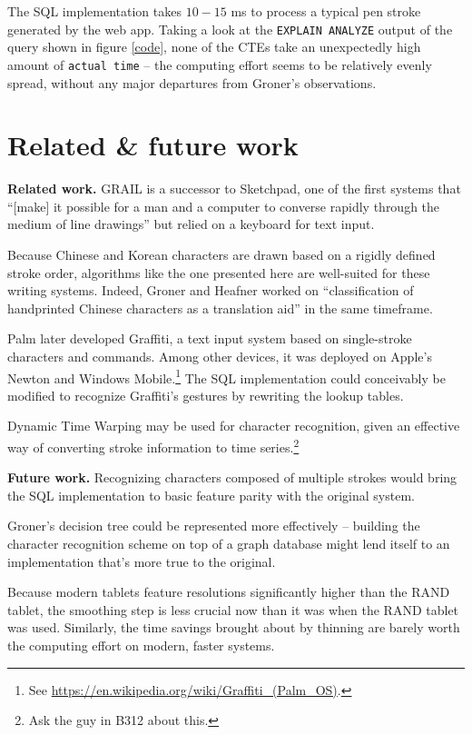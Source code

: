 \documentclass[sigconf]{acmart}
\begin{document}
The SQL implementation takes $10-15$ ms to process a typical pen stroke generated by the web app. Taking a look at the \texttt{EXPLAIN ANALYZE} output of the query shown in figure \ref{code}, none of the CTEs take an unexpectedly high amount of \texttt{actual time} – the computing effort seems to be relatively evenly spread, without any major departures from Groner's observations.

\section{Related \& future work}

\textbf{Related work.} GRAIL is a successor to Sketchpad, one of the first systems that \enquote{[make] it possible for a man and a computer to converse rapidly through the medium of line drawings} but relied on a keyboard for text input. \cite{sketchpad}

Because Chinese and Korean characters are drawn based on a rigidly defined stroke order, algorithms like the one presented here are well-suited for these writing systems. Indeed, Groner and Heafner worked on \enquote{classification of handprinted Chinese characters as a translation aid} \cite{chinese} in the same timeframe.

Palm later developed Graffiti, a text input system based on single-stroke characters and commands. Among other devices, it was deployed on Apple's Newton and Windows Mobile.\footnote{See \url{https://en.wikipedia.org/wiki/Graffiti_(Palm_OS)}.} The SQL implementation could conceivably be modified to recognize Graffiti's gestures by rewriting the lookup tables.

Dynamic Time Warping may be used for character recognition, given an effective way of converting stroke information to time series.\footnote{Ask the guy in B312 about this.}

\textbf{Future work.} Recognizing characters composed of multiple strokes would bring the SQL implementation to basic feature parity with the original system.

Groner's decision tree could be represented more effectively – building the character recognition scheme on top of a graph database might lend itself to an implementation that's more true to the original.

Because modern tablets feature resolutions significantly higher than the RAND tablet, the smoothing step is less crucial now than it was when the RAND tablet was used. Similarly, the time savings brought about by thinning are barely worth the computing effort on modern, faster systems.



\end{document}
